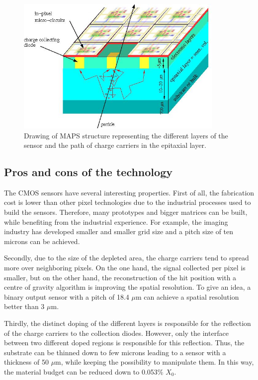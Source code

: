     \begin{figure}[!h]
      \centering
      \includegraphics[width = 10cm]{Pictures/vxd/principeMapsMIP.jpg}
      \caption{Drawing of MAPS structure representing the different layers of the sensor and the path of charge carriers in the epitaxial layer.}
      \label{fig:principleMaps}
    \end{figure}

    \subsection{Pros and cons of the technology}

    The \gls{CMOS} sensors have several interesting properties.
    First of all, the fabrication cost is lower than other pixel technologies due to the industrial processes used to build the sensors.
    Therefore, many prototypes and bigger matrices can be built, while benefiting from the industrial experience.
    For example, the imaging industry has developed smaller and smaller grid size and a pitch size of ten microns can be achieved.
    
    Secondly, due to the size of the depleted area, the charge carriers tend to spread more over neighboring pixels.
    On the one hand, the signal collected per pixel is smaller, but on the other hand, the reconstruction of the hit position with a centre of gravity algorithm is improving the spatial resolution.
    To give an idea, a binary output sensor with a pitch of 18.4 $\mu\text{m}$ can achieve a spatial resolution better than 3 $\mu\text{m}$.

    Thirdly, the distinct doping of the different layers is responsible for the reflection of the charge carriers to the collection diodes.
    However, only the interface between two different doped regions is responsible for this reflection.
    Thus, the substrate can be thinned down to few microns leading to a sensor with a thickness of 50 $\mu\text{m}$, while keeping the possibility to manipulate them.
    In this way, the material budget can be reduced down to 0.053\% $X_0$.

